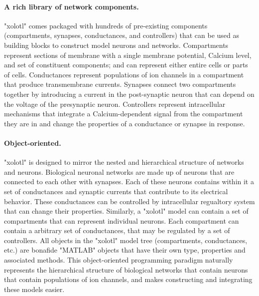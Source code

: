 \documentclass{frontiersSCNS} %
\begin{document}
\paragraph{A rich library of network components.} "xolotl" comes packaged with hundreds of pre-existing components (compartments, synapses, conductances, and controllers) that can be used as building blocks to construct model neurons and networks. Compartments represent sections of membrane with a single membrane potential, Calcium level, and set of constituent components; and can represent either entire cells or parts of cells. Conductances represent populations of ion channels in a compartment that produce transmembrane currents. Synapses connect two compartments together by introducing a current in the post-synaptic neuron that can depend on the voltage of the presynaptic neuron. Controllers represent intracellular mechanisms that integrate a Calcium-dependent signal from the compartment they are in and  change the properties of a conductance or synapse in response. 

\paragraph{Object-oriented.}
"xolotl" is designed to mirror the nested and hierarchical structure of networks and neurons. Biological neuronal networks are made up of neurons that are connected to each other with synapses. Each of these neurons contains within it a set of conductances and synaptic currents that contribute to its electrical behavior. These conductances can be controlled by intracellular regualtory system that can change their properties. Similarly, a "xolotl" model can contain a set of compartments that can represent individual neurons. Each compartment can contain a arbitrary set of conductances, that may be regulated by a set of controllers. All objects in the "xolotl" model tree (compartments, conductances, etc.) are bonafide "MATLAB" objects that have their own type, properties and associated methods. This object-oriented programming paradigm naturally represents the hierarchical structure of biological networks that contain neurons that contain populations of ion channels, and makes constructing and integrating these models easier. 
\end{document}

